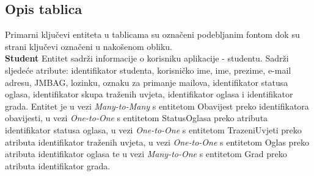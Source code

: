         			\subsection{Opis tablica}

        			Primarni ključevi entiteta u tablicama su označeni podebljanim fontom dok su strani ključevi označeni u nakošenom obliku.\\



        			\textbf{Student } Entitet sadrži informacije o korisniku aplikacije - studentu. Sadrži sljedeće atribute: identifikator studenta, korisničko ime, ime, prezime, e-mail adresu, JMBAG, lozinku, oznaku za primanje mailova, identifikator statusa oglasa, identifikator skupa traženih uvjeta, identifikator oglasa i identifikator grada. Entitet je u vezi \textit{Many-to-Many} s entitetom Obavijest preko identifikatora obavijesti, u vezi \textit{One-to-One} s entitetom StatusOglasa preko atributa identifikator statusa oglasa, u vezi \textit{One-to-One} s entitetom TrazeniUvjeti preko atributa identifikator traženih uvjeta, u vezi \textit{One-to-One} s entitetom Oglas preko atributa identifikator oglasa te u vezi \textit{Many-to-One} s entitetom Grad preko atributa identifikator grada.



